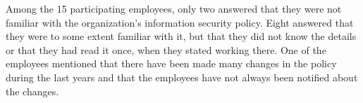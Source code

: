 
Among the 15 participating employees, only two answered that they were not familiar with the organization's information security policy. Eight answered that they were to some extent familiar with it, but that they did not know the details or that they had read it once, when they stated working there. One of the employees mentioned that there have been made many changes in the policy during the last years and that the employees have not always been notified about the changes.

